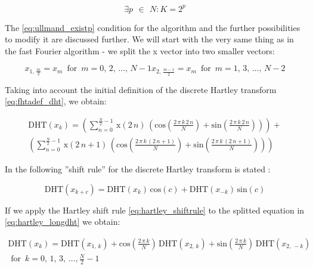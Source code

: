 \documentclass[12pt,twoside,a4paper]{article}
\numberwithin{equation}{subsection}
\numberwithin{figure}{subsection}
\begin{document}
\begin{equation} \label{eq:ullmand_existp}
  \exists p\,\ \in\ \,N : K=2^{p}
\end{equation}


The \ref{eq:ullmand_existp} condition for the algorithm and the further possibilities to modify it are discussed further. We will
start with the very same thing as in the fast Fourier algorithm - we split the x vector into two smaller vectors:

\begin{subequations} \label{eq:hartley_smallervectors}
  \begin{equation}   \label{eq:hsvs_even}
    {x_{1, \,\frac {m}{2}}}={x_{m}}\, \mbox{ for }\, m=0, \,2,\,\ldots,\,N - 1
  \end{equation}
  \begin{equation}   \label{eq:hsvs_odd}
    {x_{2, \,\frac {m - 1}{2}}}={x_{m}}\, \mbox{ for }\, m=1, \,3,\,\ldots,\,N - 2
  \end{equation}
\end{subequations}

Taking into account the initial definition of the discrete Hartley transform \ref{eq:fhtadef_dht}, we obtain:

\begin{multline}  \label{eq:hartley_longdht}
 \mathrm{DHT}({x_{k}})= \left(  \! \sum_{n=0}^{\frac {N}{2} - 1}\,\mathrm{x}(2\,n)\,(\mathrm{cos}(\frac {2\,\pi \,k\,2\,n}{N}) +
 \mathrm{sin}(\frac {2\,\pi \,k\,2\,n}{N})) \! \right)  + \\
 \left(  \! \sum_{n=0}^{\frac {N}{2} - 1}\,\mathrm{x}(2\,n +
 1)\,(\mathrm{cos}(\frac {2\,\pi \,k\,(2\,n + 1)}{N}) + \mathrm{sin}(\frac {2\,\pi \,k\,(2\,n + 1)}{N})) \! \right)
\end{multline}

In \cite{ullmann_algorithm} the following ''shift rule'' for the discrete Hartley transform is stated :

\begin{equation} \label{eq:hartley_shiftrule}
  \mathrm{DHT}({x_{k + c}})=\mathrm{DHT}({x_{k}})\,\mathrm{cos}(c)
 + \mathrm{DHT}({x_{ - k}})\,\mathrm{sin}(c)
\end{equation}

If we apply the Hartley shift rule  \ref{eq:hartley_shiftrule} to the splitted equation in \ref{eq:hartley_longdht} we obtain:

\begin{multline} \label{eq:hartley_srapplied}
  \mathrm{DHT}({x_{k}})=\mathrm{DHT}({x_{1, \,k}}) + \mathrm{cos}(\frac {2\,\pi \,k}{N})\,\mathrm{DHT}({x_{2, \,k}}) +
  \mathrm{sin}(\frac {2\,\pi \,k}{N})\,\mathrm{DHT}({x_{2, \, - k}})\, \\
  \mbox{ for }\,k=0, \,1, \,3,\,\ldots,\frac {N}{2} - 1
\end{multline}
\end{document}
